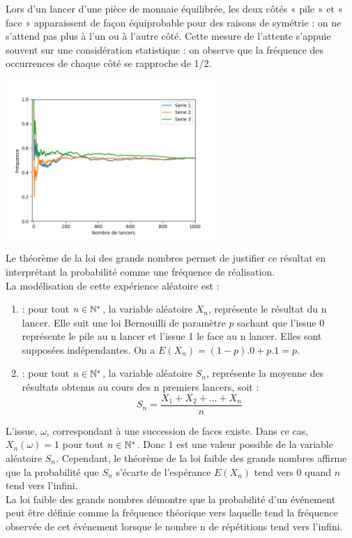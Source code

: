 \documentclass{book}
\begin{document}
Lors d'un lancer d'une pièce de monnaie équilibrée, les deux côtés « pile » et « face » apparaissent de façon équiprobable pour des raisons de symétrie : on ne s'attend pas plus à l'un ou à l'autre côté. Cette mesure de l'attente s'appuie souvent sur une considération statistique : on observe que la fréquence des occurrences de chaque côté se rapproche de 1/2. 
\begin{center}
\includegraphics[width=8cm]{frequence_lancer.png}
\end{center}
Le théorème de la loi des grands nombres permet de justifier ce résultat en interprétant la probabilité comme une fréquence de réalisation.\\
La modélisation de cette expérience aléatoire est :
\begin{enumerate}
\item  {} :  pour tout $n\in\mathbb{N}^*$,  la variable aléatoire $X_n$, représente le résultat du n lancer. Elle  suit une loi Bernouilli de paramètre $p$ sachant que l'issue 0 représente le pile au n lancer et l'issue 1 le face au n lancer. Elles sont supposées indépendantes.  On a $E(X_n) = (1 - p).0 + p.1  = p.$ 
\item {} : pour tout $n\in\mathbb{N}^*$,  la variable aléatoire $S_n$, représente la moyenne des résultats obtenus au cours des n premiers lancers, soit :
$$ S_n =\frac{X_1+X_2+\dots+X_n}{n}$$ 
\end{enumerate}
L'issue, $\omega$, correspondant à une succession de faces existe. Dans ce cas, $X_n(\omega)=1$ pour tout $n\in \mathbb{N}^*$. Donc $1$ est une valeur possible de la variable aléatoire $S_n$. 
Cependant, le théorème de la loi faible des grands nombres affirme que la probabilité que $S_n$ s'écarte de l'espérance $E(X_n)$ tend vers 0 quand $n$ tend vers l'infini. \\
La loi faible des grands nombres démontre que la probabilité d'un événement peut être définie comme la fréquence théorique vers laquelle tend la
fréquence observée de cet événement lorsque le nombre n de répétitions tend vers l'infini.
\end{document}
